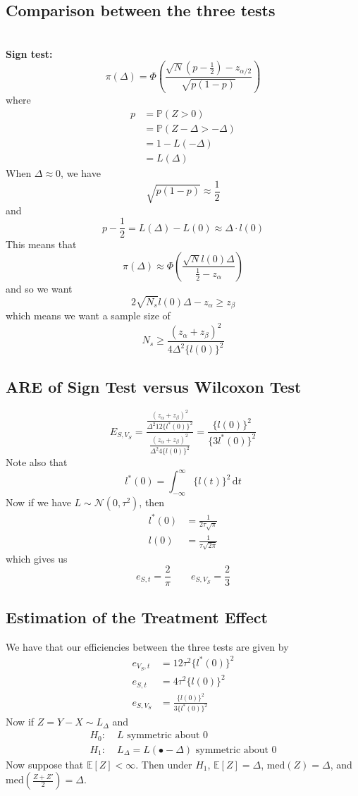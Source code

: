 \documentclass[a4paper,12pt]{amsart}
\newcommand{\dt}{\,\mathrm{d}t}
\newcommand{\E}[1]{\mathbb{E}\left[#1\right]}
\newcommand{\p}[1]{\mathbb{P}\left(#1\right)}
\begin{document}
\subsection{Comparison between the three tests}
\qquad\\
\textbf{Sign test:}
\[\pi(\Delta) = \Phi\left(\frac{\sqrt{N}(p - \frac{1}{2}) - z_{\alpha/2}}{\sqrt{p(1-p)}}\right)\]
where
\begin{align*}
p &= \p{Z>0}\\
&= \p{Z-\Delta >  - \Delta}\\
&= 1 - L(- \Delta)\\
&= L(\Delta)
\end{align*}
When $\Delta \approx 0 $, we have 
\[\sqrt{p(1-p)} \approx \frac{1}{2}\]
 and
\[p- \frac{1}{2} = L(\Delta) - L(0) \approx \Delta \cdot l(0)\]
This means that
\[\pi(\Delta) \approx \Phi\left(\frac{\sqrt{N}l(0)\Delta}{\frac{1}{2} - z_\alpha}\right)\]
and so we want
\[2 \sqrt{N_s} l(0) \Delta  - z_\alpha \geq z_\beta\]
which means we want a sample size of
\[N_s \geq \frac{(z_\alpha + z_\beta)^2}{4 \Delta^2 \{l(0)\}^2}\]

\subsection{ARE of Sign Test versus Wilcoxon Test}
\[E_{S,V_S} = \frac{\frac{(z_\alpha + z_\beta)^2}{\Delta^2 12 \{l^*(0)\}^2}}{\frac{(z_\alpha + z_\beta)^2}{\Delta^2 4 \{l(0)\}^2}} =  \frac{\{l(0)\}^2}{\{3l^*(0)\}^2}\]
Note also that
\[l^*(0) = \int_{-\infty}^\infty \! \{l(t)\}^2 \dt\]
Now if we have $L \sim \mathcal{N}(0,\tau^2)$, then
\begin{align*}
l^*(0) &= \frac{1}{2\tau \sqrt{\pi}}\\
l(0) &= \frac{1}{\tau \sqrt{2 \pi}}
\end{align*}
which gives us 
\[e_{S,t} = \frac{2}{\pi} \qquad e_{S,V_S} = \frac{2}{3}\]

\subsection{Estimation of the Treatment Effect}
We have that our efficiencies between the three tests are given by
\begin{align*}
e_{V_S,t} &= 12 \tau^2 \{l^*(0)\}^2\\
e_{S,t} &= 4 \tau^2 \{l(0)\}^2\\
e_{S,V_S} &= \frac{\{l(0)\}^2}{3\{l^*(0)\}^2}
\end{align*}
Now if $Z = Y-X \sim L_\Delta$ and
\begin{align*}
H_0: &\; L \text{ symmetric about }0\\
H_1: &\; L_\Delta = L( \bullet - \Delta) \text{ symmetric about } 0
\end{align*}
Now suppose that $\E{Z} < \infty$. Then under $H_1$, $\E{Z} = \Delta$, $\mbox{med}(Z) = \Delta$, and $\mbox{med} \left(\frac{Z + Z'}{2}\right) = \Delta$. 
\end{document}
